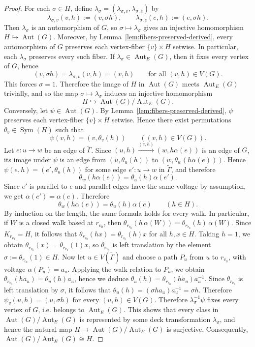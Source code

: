 \documentclass[a4paper,10pt]{amsart}
\theoremstyle{plain}
\theoremstyle{definition}
\DeclareMathOperator{\Aut}{Aut}
\DeclareMathOperator{\Sym}{Sym}
\begin{document}
\begin{proof}
For each $\sigma\in H$, define $\lambda_\sigma=(\lambda_{\sigma,v},\lambda_{\sigma,e})$ by
\[
\lambda_{\sigma,v}(v,h):=(v,\sigma h),\qquad
\lambda_{\sigma,e}(e,h):=(e,\sigma h).
\]
Then $\lambda_\sigma$ is an automorphism of $G$, so $\sigma\mapsto \lambda_\sigma$ gives an injective homomorphism $H\hookrightarrow \Aut(G)$. Moreover, by Lemma~\ref{lem:fibers-preserved-derived}, every automorphism of $G$ preserves each vertex-fiber $\{v\}\times H$ setwise. In particular, each $\lambda_\sigma$ preserves every such fiber. If $\lambda_\sigma\in \Aut_E(G)$, then it fixes every vertex of $G$, hence
\[
(v,\sigma h)=\lambda_{\sigma,v}(v,h)=(v,h)
\qquad\text{for all }(v,h)\in V(G).
\]
This forces $\sigma=1$. Therefore the image of $H$ in $\Aut(G)$ meets $\Aut_E(G)$ trivially, and so the map $\sigma\mapsto \lambda_\sigma$ induces an injective homomorphism
\[
H\hookrightarrow \Aut(G)/\Aut_E(G).
\]
Conversely, let $\psi\in\Aut(G)$. By Lemma~\ref{lem:fibers-preserved-derived}, $\psi$ preserves each vertex-fiber $\{v\}\times H$ setwise. Hence there exist permutations $\theta_v\in\Sym(H)$ such that
\[
\psi(v,h)=(v,\theta_v(h))
\qquad ((v,h)\in V(G)).
\]
Let $e:u\to w$ be an edge of $\widetilde\Gamma$. Since $(u,h)\xrightarrow{(e,h)}(w,h\alpha(e))$ is an edge of $G$, its image under $\psi$ is an edge from $(u,\theta_u(h))$ to $(w,\theta_w(h\alpha(e)))$. Hence $\psi(e,h)=(e',\theta_u(h))$ for some edge $e':u\to w$ in $\widetilde\Gamma$, and therefore
\[
\theta_w(h\alpha(e))=\theta_u(h)\alpha(e').
\]
Since $e'$ is parallel to $e$ and parallel edges have the same voltage by assumption, we get $\alpha(e')=\alpha(e)$. Therefore
\[
\theta_w(h\alpha(e))=\theta_u(h)\alpha(e)
\qquad(h\in H).
\]
By induction on the length, the same formula holds for every walk. In particular, if $W$ is a closed walk based at $r_{v_0}$, then $\theta_{r_{v_0}}(h\,\alpha(W))=\theta_{r_{v_0}}(h)\,\alpha(W)$. Since $K_{r_{v_0}}=H$, it follows that $\theta_{r_{v_0}}(hx)=\theta_{r_{v_0}}(h)x$ for all $h,x\in H$. Taking $h=1$, we obtain $\theta_{r_{v_0}}(x)=\theta_{r_{v_0}}(1)x$, so $\theta_{r_{v_0}}$ is left translation by the element $\sigma:=\theta_{r_{v_0}}(1)\in H$. Now let $u\in V(\widetilde\Gamma)$ and choose a path $P_u$ from $u$ to $r_{v_0}$, with voltage $\alpha(P_u)=a_u$. Applying the walk relation to $P_u$, we obtain $\theta_{r_{v_0}}(h a_u)=\theta_u(h)a_u$, hence we deduce $\theta_u(h)=\theta_{r_{v_0}}(h a_u)a_u^{-1}$. Since $\theta_{r_{v_0}}$ is left translation by $\sigma$, it follows that $\theta_u(h)=(\sigma h a_u)a_u^{-1}=\sigma h$. Therefore $\psi_v(u,h)=(u,\sigma h)$ for every $(u,h)\in V(G)$. Therefore $\lambda_\sigma^{-1}\psi$ fixes every vertex of $G$, i.e. belongs to $\Aut_E(G)$. This shows that every class in $\Aut(G)/\Aut_E(G)$ is represented by some deck transformation $\lambda_\sigma$, and hence the natural map $H\to \Aut(G)/\Aut_E(G)$ is surjective. Consequently, $\Aut(G)/\Aut_E(G)\cong H$.
\end{proof}
\end{document}
